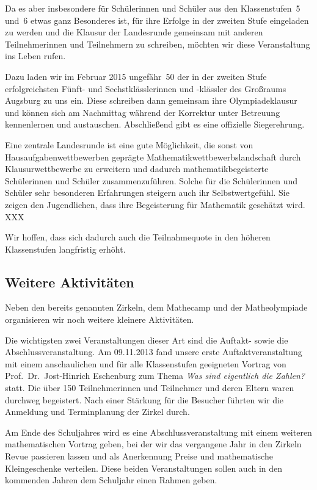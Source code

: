 \documentclass[12pt]{zettel}
\begin{document}
Da es aber insbesondere für Schülerinnen und Schüler aus den Klassenstufen~5
und~6 etwas ganz Besonderes ist, für ihre Erfolge in der zweiten Stufe
eingeladen zu werden und die Klausur der Landesrunde gemeinsam mit anderen
Teilnehmerinnen und Teilnehmern zu schreiben, möchten wir diese Veranstaltung
ins Leben rufen.

Dazu laden wir im Februar 2015 ungefähr~50 der in der zweiten Stufe
erfolgreichsten Fünft- und Sechstklässlerinnen und -klässler des Großraums
Augsburg zu uns ein. Diese schreiben dann gemeinsam ihre Olympiadeklausur und
können sich am Nachmittag während der Korrektur unter Betreuung kennenlernen
und austauschen. Abschließend gibt es eine offizielle Siegerehrung.

Eine zentrale Landesrunde ist eine gute Möglichkeit, die sonst von
Hausaufgabenwettbewerben geprägte Mathematikwettbewerbslandschaft durch
Klausurwettbewerbe zu erweitern und dadurch mathematikbegeisterte Schülerinnen
und Schüler zusammenzuführen. Solche für die Schülerinnen und Schüler
sehr besonderen Erfahrungen steigern auch ihr Selbstwertgefühl. Sie zeigen
den Jugendlichen, dass ihre Begeisterung für Mathematik geschätzt wird. XXX

Wir hoffen, dass sich dadurch auch die Teilnahmequote
in den höheren Klassenstufen langfristig erhöht.


\subsection{Weitere Aktivitäten}

Neben den bereits genannten Zirkeln, dem Mathecamp und der
Matheolympiade organisieren wir noch weitere kleinere
Aktivitäten.

Die wichtigsten zwei Veranstaltungen dieser Art sind die Auftakt- sowie die
Abschlussveranstaltung. Am 09.11.2013 fand unsere erste
Auftaktveranstaltung mit einem anschaulichen und für alle Klassenstufen
geeigneten Vortrag von
Prof.~Dr.~Jost-Hinrich Eschenburg zum Thema \emph{Was sind eigentlich die
Zahlen?} statt.
Die über 150 Teilnehmerinnen und Teilnehmer und deren Eltern waren durchweg
begeistert. Nach einer Stärkung für die Besucher führten wir
die Anmeldung und Terminplanung der Zirkel durch.

Am Ende des Schuljahres wird es eine Abschlussveranstaltung mit einem
weiteren mathematischen Vortrag geben, bei der wir
das vergangene Jahr in den Zirkeln Revue passieren lassen und als Anerkennung
Preise und mathematische Kleingeschenke verteilen. Diese beiden Veranstaltungen sollen
auch in den kommenden Jahren dem Schuljahr einen Rahmen geben.
\end{document}
